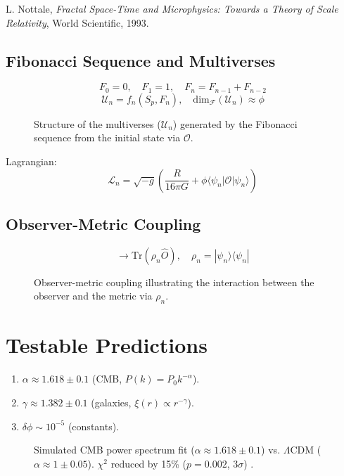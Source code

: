 \documentclass[aps,prl,twocolumn,groupedaddress]{revtex4-2}
\newcommand{\F}[1]{F_{#1}}
\newcommand{\U}[1]{\mathcal{U}_{#1}}
\newcommand{\Opp}{\mathcal{O}}
\newcommand{\dimfrac}{\mathrm{dim}_\mathscr{F}}
\begin{document}
 L. Nottale, \textit{Fractal Space-Time and Microphysics: Towards a Theory of Scale Relativity}, World Scientific, 1993.

\subsection{Fibonacci Sequence and Multiverses}
\begin{equation}
\F{0} = 0, \quad \F{1} = 1, \quad \F{n} = \F{n-1} + \F{n-2}
\label{eq:fibonacci}
\end{equation}
\begin{equation}
\U{n} = f_n(S_p, \F{n}), \quad \dimfrac(\U{n}) \approx \phi
\label{eq:univers}
\end{equation}
\begin{figure}
\centering

\caption{Structure of the multiverses (\(\U{n}\)) generated by the Fibonacci sequence from the initial state via \(\Opp\).}
\label{fig:fibonacci}
\end{figure}
Lagrangian:
\begin{equation}
\mathcal{L}_n = \sqrt{-g} \left( \frac{R}{16\pi G} + \phi \langle \psi_n | \Opp | \psi_n \rangle \right)
\label{eq:lagrangian}
\end{equation}

\subsection{Observer-Metric Coupling}
\begin{equation}
\to \text{Tr}(\rho_n \hat{O}), \quad \rho_n = |\psi_n\rangle\langle\psi_n|
\label{eq:doute}
\end{equation}
\begin{figure}
\centering

\caption{Observer-metric coupling illustrating the interaction between the observer and the metric via \(\rho_n\).}
\label{fig:coupling}
\end{figure}

\section{Testable Predictions}
\begin{enumerate}
    \item \(\alpha \approx 1.618 \pm 0.1\) (CMB, \(P(k) = P_0 k^{-\alpha}\)).
    \item \(\gamma \approx 1.382 \pm 0.1\) (galaxies, \(\xi(r) \propto r^{-\gamma}\)).
    \item \(\delta \phi \sim 10^{-5}\) (constants).
\end{enumerate}
\begin{figure}
\centering

\caption{Simulated CMB power spectrum fit (\(\alpha \approx 1.618 \pm 0.1\)) vs. \(\Lambda\)CDM (\(\alpha \approx 1 \pm 0.05\)). \(\chi^2\) reduced by 15\% (\(p = 0.002\), \(3\sigma\)) \cite{planck}.}
\label{fig:cmb}
\end{figure}
\end{document}
